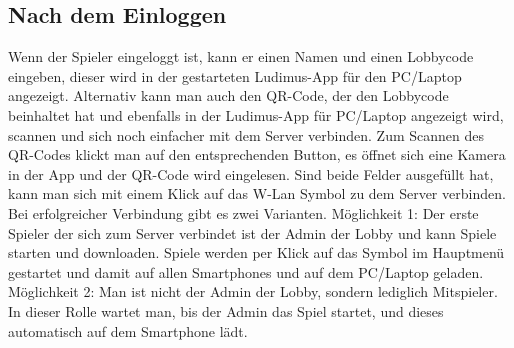 \subsection{Nach dem Einloggen}
Wenn der Spieler eingeloggt ist, kann er einen Namen und einen Lobbycode eingeben, dieser wird in der gestarteten Ludimus-App für den PC/Laptop angezeigt. Alternativ kann man auch den QR-Code, der den Lobbycode beinhaltet hat und ebenfalls in der Ludimus-App für PC/Laptop angezeigt wird, scannen und sich noch einfacher mit dem Server verbinden. Zum Scannen des QR-Codes klickt man auf den entsprechenden Button, es öffnet sich eine Kamera in der App und der QR-Code wird eingelesen. Sind beide Felder ausgefüllt hat, kann man sich mit einem Klick auf das W-Lan Symbol zu dem Server verbinden. Bei erfolgreicher Verbindung gibt es zwei Varianten. Möglichkeit 1: Der erste Spieler der sich zum Server verbindet ist der Admin der Lobby und kann Spiele starten und downloaden. Spiele werden per Klick auf das Symbol im Hauptmenü gestartet und damit auf allen Smartphones und auf dem PC/Laptop geladen. Möglichkeit 2: 
Man ist nicht der Admin der Lobby, sondern lediglich Mitspieler. In dieser Rolle wartet man, bis der Admin das Spiel startet, und dieses automatisch auf dem Smartphone lädt.
